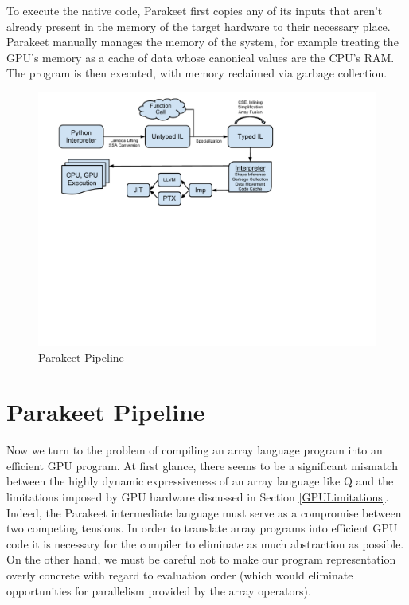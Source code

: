 \documentclass[10pt,twocolumn]{article}
\begin{document}
To execute the native code, Parakeet first copies any of its inputs that aren't already present in the memory of the target hardware to their necessary place.  Parakeet manually manages the memory of the system, for example treating the GPU's memory as a cache of data whose canonical values are the CPU's RAM. The program is then executed, with memory reclaimed via garbage collection.

\begin{figure}[t!bh]
\begin{center}
\leavevmode
\includegraphics[scale=0.6, trim=0pt 310pt 140pt 80pt]{ParakeetNumPyOverview.pdf}
\end{center}
\caption{Parakeet Pipeline}
\label{fig:overview}
\end{figure}

\section{Parakeet Pipeline}
\label{Pipeline}
Now we turn to the problem of compiling an array language program into an efficient GPU program. At first glance, there seems to be a significant mismatch between the highly dynamic expressiveness of an array language like Q and the limitations imposed by GPU hardware discussed in Section \ref{GPULimitations}. Indeed, the Parakeet intermediate language must serve as a compromise between two competing tensions. In order to translate array programs into efficient GPU code it is necessary for the compiler to eliminate as much abstraction as possible. On the other hand, we must be careful not to make our program representation overly concrete with regard to evaluation order (which would eliminate opportunities for parallelism provided by the array operators). 
\end{document}
